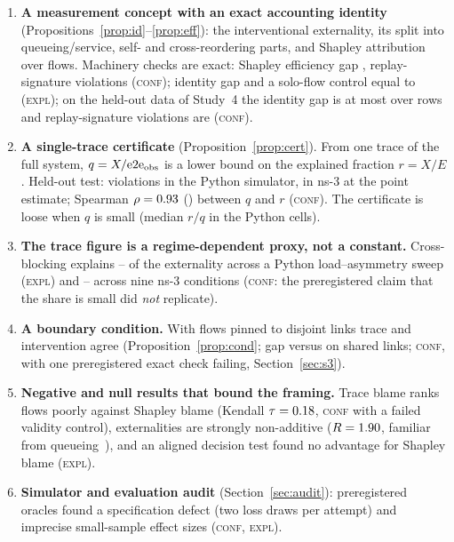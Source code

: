 \documentclass[11pt]{article}
\newcommand{\tagC}{\textsc{conf}}
\newcommand{\tagE}{\textsc{expl}}
\begin{document}
\begin{enumerate}
  \item \textbf{A measurement concept with an exact accounting identity} (Propositions~\ref{prop:id}--\ref{prop:eff}): the interventional externality, its split into queueing/service, self- and cross-reordering parts, and Shapley attribution over flows. Machinery checks are exact: Shapley efficiency gap \SBVone{}, replay-signature violations \SBVtwo{} (\tagC{}); identity gap \SBBIdentity{} and a solo-flow control equal to \SBBSolo{} (\tagE{}); on the held-out data of Study~4 the identity gap is at most \FourVTenGap{} over \FourVTenRows{} rows and replay-signature violations are \FourVTenSig{} (\tagC{}).
  \item \textbf{A single-trace certificate} (Proposition~\ref{prop:cert}). From one trace of the full system, $q=X/\mathrm{e2e}_{\rm obs}$ is a lower bound on the explained fraction $r=X/E$. Held-out test: \FourPyViol{} violations in the Python simulator, \FourNsViol{} in ns-3 at the point estimate; Spearman $\rho=0.93$ (\FourRhoCI{}) between $q$ and $r$ (\tagC{}). The certificate is loose when $q$ is small (median $r/q$ \FourRatioMedPy{} in the Python cells).
  \item \textbf{The trace figure is a regime-dependent proxy, not a constant.} Cross-blocking explains \SBBCrossMin{}--\SBBCrossMax{} of the externality across a Python load--asymmetry sweep (\tagE{}) and \ElevenMin{}--\ElevenMax{} across nine ns-3 conditions (\tagC{}: the preregistered claim that the share is small did \emph{not} replicate).
  \item \textbf{A boundary condition.} With flows pinned to disjoint links trace and intervention agree (Proposition~\ref{prop:cond}; gap \TenGapPinned{} \TenGapPinnedCI{} versus \TenGapShared{} on shared links; \tagC{}, with one preregistered exact check failing, Section~\ref{sec:s3}).
  \item \textbf{Negative and null results that bound the framing.} Trace blame ranks flows poorly against Shapley blame (Kendall $\tau=0.18$, \tagC{} with a failed validity control), externalities are strongly non-additive ($R=1.90$, familiar from queueing~\cite{naor1969tolls}), and an aligned decision test found no advantage for Shapley blame (\tagE{}).
  \item \textbf{Simulator and evaluation audit} (Section~\ref{sec:audit}): preregistered oracles found a specification defect (two loss draws per attempt) and imprecise small-sample effect sizes (\tagC{}, \tagE{}).
\end{enumerate}
\end{document}
